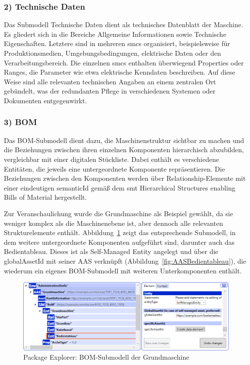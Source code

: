 \subsubsection*{2) Technische Daten}
\vspace{-0.5em}

Das Submodell Technische Daten dient als technisches Datenblatt der Maschine.  
Es gliedert sich in die Bereiche Allgemeine Informationen sowie Technische Eigenschaften. 
Letztere sind in mehreren \acsp{smc} organisiert, beispielsweise für Produktionsmedien, Umgebungsbedingungen, elektrische Daten oder den Verarbeitungsbereich. 
Die einzelnen \acsp{smc} enthalten überwiegend Properties oder Ranges, die Parameter wie etwa elektrische Kenndaten beschreiben. 
Auf diese Weise sind alle relevanten technischen Angaben an einem zentralen Ort gebündelt, was der redundanten Pflege in verschiedenen Systemen oder Dokumenten entgegenwirkt. 

\subsubsection*{3) BOM}
\vspace{-0.5em}

Das BOM-Submodell dient dazu, die Maschinenstruktur sichtbar zu machen und die Beziehungen zwischen ihren einzelnen Komponenten hierarchisch abzubilden, vergleichbar mit einer digitalen Stückliste.
Dabei enthält es verschiedene Entitäten, die jeweils eine untergeordnete Komponente repräsentieren.
Die Beziehungen zwischen den Komponenten werden über Relationship-Elemente mit einer eindeutigen semanticId gemäß dem \acs{smt} Hierarchical Structures enabling Bills of Material \cite{SpezifikationHierachischeStrukturen} hergestellt.

Zur Veranschaulichung wurde die Grundmaschine als Beispiel gewählt, da sie weniger komplex als die Maschinenebene ist, aber dennoch alle relevanten Strukturelemente enthält.
Abbildung~\ref{fig:BOMSubmodelGrundmashcine} zeigt das entsprechende Submodell, in dem weitere untergeordnete Komponenten aufgeführt sind, darunter auch das Bedientableau.
Dieses ist als Self-Managed Entity angelegt und über die globalAssetId mit seiner AAS verknüpft (Abbildung~\ref{fig:AASBedientableau}), die wiederum ein eigenes BOM-Submodell mit weiteren Unterkomponenten enthält.

\begin{figure}[htbp]
    \centering
        \includegraphics[width=1\textwidth]{Bilder/ErgebnissePackageExplorer/GundmaschneEntitie.PNG}
    \caption{Package Explorer: BOM-Submodell der Grundmaschine}
    \label{fig:BOMSubmodelGrundmashcine}
\end{figure}

